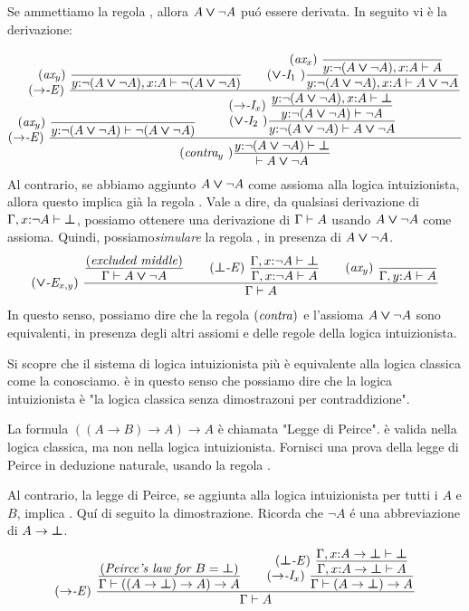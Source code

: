 \documentclass{article}
\begin{document}
Se ammettiamo la regola , allora $A\mathbin{\textrm{\rm\boldmath $\vee$}}\neg A$ pu\'o essere
derivata. In seguito vi \`e la derivazione:
{\footnotesize
\[ \trule{$\to$-E}\ \deriv{\raisebox{-6ex}{$\squishr{\trule{ax$_y$}~}\deriv{}{\typ{y}{\neg(A\cor\neg A)}\tj\neg(A\cor\neg A)}$}\hspace{-24ex}
  \squishr{\trule{$\to$-E}~}\deriv{\squishr{\trule{ax$_y$}~}\deriv{}{\typ{y}{\neg(A\cor\neg A)},\typ{x}{A}\tj\neg(A\cor\neg A)}
    \sep \trule{$\cor$-I$_1$~}\deriv{\squishr{\trule{ax$_x$}~}\deriv{}{\typ{y}{\neg(A\cor\neg A)},\typ{x}{A}\tj A}}{\typ{y}{\neg(A\cor\neg A)},\typ{x}{A}\tj A\cor\neg A}}{
   \trule{$\cor$-I$_2$~}\deriv{ 
  \squishr{\trule{$\to$-I$_x$}~}\deriv{\typ{y}{\neg(A\cor\neg A)},\typ{x}{A}\tj \cfalse}{\typ{y}{\neg(A\cor\neg A)}\tj \neg A}
  }{\typ{y}{\neg(A\cor\neg A)}\tj A\cor \neg A}\hspace{-18ex}
  }}{\trule{contra$_y$~}\deriv{\typ{y}{\neg(A\cor\neg A)}\tj\cfalse}{\tj A\cor\neg A}}
\]}
Al contrario, se abbiamo aggiunto $A\mathbin{\textrm{\rm\boldmath $\vee$}}\neg A$ come assioma alla logica intuizionista, allora questo implica gi\`a la regola   . Vale a dire, da qualsiasi derivazione di $\Gamma,x{:}\neg A\vdash\textrm{\rm\boldmath $\bot$}$, possiamo ottenere una derivazione di $\Gamma\vdash A$ usando $A\mathbin{\textrm{\rm\boldmath $\vee$}}\neg A$ come assioma. Quindi, possiamo{\em simulare} la regola , in presenza di
$A\mathbin{\textrm{\rm\boldmath $\vee$}}\neg A$.
\[ \trule{$\cor$-E$_{x,y}$}\ \deriv{\deriv{\trule{excluded middle}}{\Gamma\tj A\cor \neg A} \sep
 \trule{$\cfalse$-E}\ \deriv{ \Gamma,\typ{x}{\neg A}\tj\cfalse}{\Gamma,\typ{x}{\neg A}\tj A}
\sep \trule{ax$_y$}\ \deriv{}{\Gamma,\typ{y}{A}\tj A}}{\Gamma\tj A}
\]
In questo senso, possiamo dire che la regola $\textrm{(\textit{contra\/})}$ e l'assioma
$A\mathbin{\textrm{\rm\boldmath $\vee$}}\neg A$ sono equivalenti, in presenza degli altri assiomi e delle regole della logica intuizionista.

Si scopre che il sistema di logica intuizionista più 
 \`e equivalente alla logica classica come la conosciamo. \`e in questo senso che possiamo dire che la logica intuizionista \`e "la logica classica senza dimostrazoni per contraddizione".

\begin{exercise}
  La formula $((A\to B)\to A)\to A$ \`e chiamata "Legge di Peirce". \`e valida nella logica classica, 
ma non nella logica intuizionista. Fornisci una prova della legge di Peirce in deduzione naturale, usando la regola 
  .
\end{exercise}

Al contrario, la legge di Peirce, se aggiunta alla logica intuizionista per tutti i
$A$ e $B$, implica . Qu\'i di seguito la dimostrazione. Ricorda che 
$\neg A$ \'e una abbreviazione di $A\to\textrm{\rm\boldmath $\bot$}$.
\[ \trule{$\to$-E}~
   \deriv{
   \deriv{\trule{Peirce's law for $B=\cfalse$}}
         {\Gamma\tj((A\to\cfalse)\to A)\to A}
   \sep
   \trule{$\to$-I$_x$}~
   \deriv{
   \squishr{\trule{$\cfalse$-E}~}
   \deriv{\Gamma,\typ{x}{A\to\cfalse}\tj\cfalse}
         {\Gamma,\typ{x}{A\to\cfalse}\tj A}
   }
   {\Gamma\tj(A\to\cfalse)\to A}
   }
   {\Gamma\tj A}
\]
\end{document}
